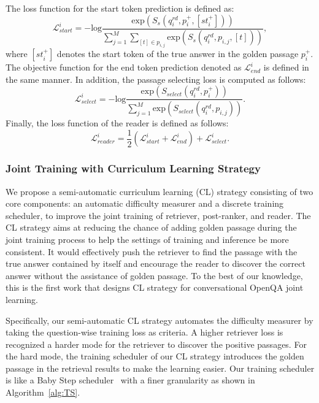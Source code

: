 The loss function for the start token prediction is defined as:
\begin{equation}
    \mathcal{L}^i_{start}=-\mathrm{log}\frac{\mathrm{exp}(S_s(q_i^{rd},p_i^+,[st_i^+]))}{\sum_{j=1}^{M}\sum_{[t]\in p_{i,j}}\mathrm{exp}(S_s(q_i^{rd},p_{i,j}, [t]))},
\end{equation}
where $[st_i^+]$ denotes the start token of the true answer in the golden passage $p_i^+$.
The objective function for the end token prediction denoted as $\mathcal{L}^i_{end}$ is defined in the same manner. In addition, the passage selecting loss is computed as follows:
\begin{equation}
    \mathcal{L}^i_{select}=-\mathrm{log}\frac{\mathrm{exp}(S_{select}(q_i^{rd},p_i^+))}{\sum_{j=1}^{M} \mathrm{exp}(S_{select}(q_i^{rd},p_{i,j}))}.
\end{equation}
Finally, the loss function of the reader is defined as follows:
\begin{equation}\label{eq:reader}
    \mathcal{L}_{reader}^i = \frac{1}{2}(\mathcal{L}_{start}^i+\mathcal{L}_{end}^i)+\mathcal{L}_{select}^i.
\end{equation}

\subsubsection{Joint Training with Curriculum Learning Strategy}
We propose a semi-automatic curriculum learning (CL) strategy consisting of two core components: an automatic difficulty measurer and a discrete training scheduler, to improve the joint training of retriever, post-ranker, and reader.
The CL strategy aims at reducing the chance of adding golden passage during the joint training process to help the settings of training and inference be more consistent. 
It would effectively push the retriever to find the passage with the true answer contained by itself and encourage the reader to discover the correct answer without the assistance of golden passage.
To the best of our knowledge, this is the first work that designs CL strategy for conversational OpenQA joint learning.

Specifically, our semi-automatic CL strategy automates the difficulty measurer by taking the question-wise training loss as criteria. A higher retriever loss is recognized a harder mode for the retriever to discover the positive passages. For the hard mode, the training scheduler of our CL strategy introduces the golden passage in the retrieval results to make the learning easier. 
Our training scheduler is like a Baby Step scheduler~\cite{bengio2009curriculum,spitkovsky2010baby} with a finer granularity as shown in Algorithm~\ref{alg:TS}.


